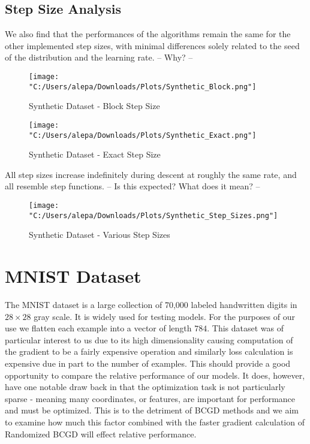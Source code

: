 \documentclass{article}
\begin{document}
\subsection{Step Size Analysis}
We also find that the performances of the algorithms remain the same for the other implemented step sizes, with minimal differences solely related to the seed of the distribution and the learning rate. -- Why? --

\begin{figure}[H]
    \centering
    \texttt{[image: "C:/Users/alepa/Downloads/Plots/Synthetic\_Block.png"]}
    \caption{Synthetic Dataset - Block Step Size}
    \label{fig:synthetic_block}
\end{figure}

\begin{figure}[H]
    \centering
    \texttt{[image: "C:/Users/alepa/Downloads/Plots/Synthetic\_Exact.png"]}
    \caption{Synthetic Dataset - Exact Step Size}
    \label{fig:synthetic_exact}
\end{figure}

All step sizes increase indefinitely during descent at roughly the same rate, and all resemble step functions. -- Is this expected? What does it mean? --
\begin{figure}[H]
    \centering
    \texttt{[image: "C:/Users/alepa/Downloads/Plots/Synthetic\_Step\_Sizes.png"]}
    \caption{Synthetic Dataset - Various Step Sizes}
    \label{fig:synthetic_step_sizes}
\end{figure}


\section{MNIST Dataset}
The MNIST dataset is a large collection of 70,000 labeled handwritten digits in $28\times28$ gray scale. It is widely used for testing models. For the purposes of our use we flatten each example into a vector of length $784$. This dataset was of particular interest to us due to its high dimensionality causing computation of the gradient to be a fairly expensive operation and similarly loss calculation is expensive due in part to the number of examples. This should provide a good opportunity to compare the relative performance of our models. It does, however, have one notable draw back in that the optimization task is not particularly sparse - meaning many coordinates, or features, are important for performance and must be optimized. This is to the detriment of BCGD methods and we aim to examine how much this factor combined with the faster gradient calculation of Randomized BCGD will effect relative performance.
\end{document}
